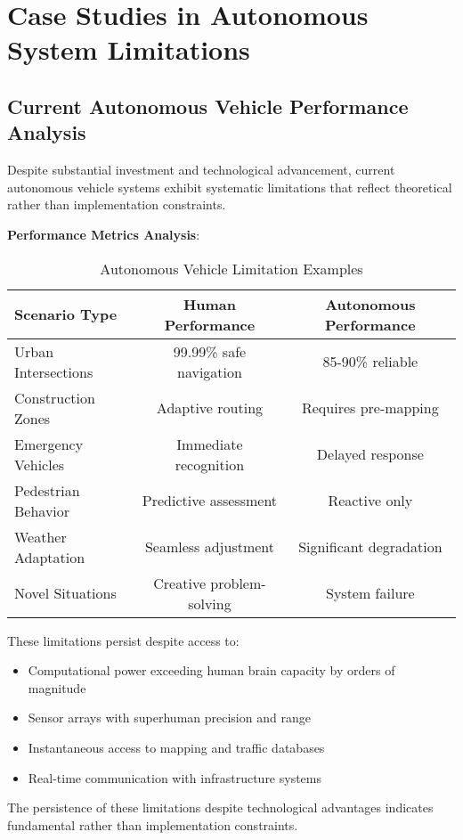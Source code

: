 \documentclass[12pt,a4paper]{article}
\begin{document}
\section{Case Studies in Autonomous System Limitations}

\subsection{Current Autonomous Vehicle Performance Analysis}

Despite substantial investment and technological advancement, current autonomous vehicle systems exhibit systematic limitations that reflect theoretical rather than implementation constraints.

\textbf{Performance Metrics Analysis}:

\begin{table}[h]
\centering
\caption{Autonomous Vehicle Limitation Examples}
\begin{tabular}{lcc}
\toprule
\textbf{Scenario Type} & \textbf{Human Performance} & \textbf{Autonomous Performance} \\
\midrule
Urban Intersections & 99.99\% safe navigation & 85-90\% reliable \\
Construction Zones & Adaptive routing & Requires pre-mapping \\
Emergency Vehicles & Immediate recognition & Delayed response \\
Pedestrian Behavior & Predictive assessment & Reactive only \\
Weather Adaptation & Seamless adjustment & Significant degradation \\
Novel Situations & Creative problem-solving & System failure \\
\bottomrule
\end{tabular}
\label{tab:av_limitations}
\end{table}

These limitations persist despite access to:
\begin{itemize}
\item Computational power exceeding human brain capacity by orders of magnitude
\item Sensor arrays with superhuman precision and range
\item Instantaneous access to mapping and traffic databases
\item Real-time communication with infrastructure systems
\end{itemize}

The persistence of these limitations despite technological advantages indicates fundamental rather than implementation constraints.
\end{document}
